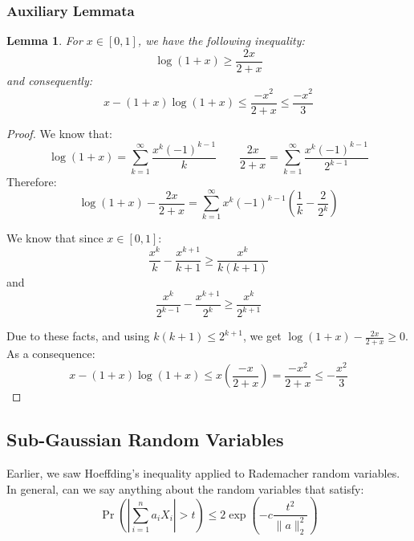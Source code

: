 \documentclass{article}
\newtheorem{lemma}{Lemma}[subsection]
\theoremstyle{remark}
\begin{document}
\subsubsection{Auxiliary Lemmata}
\begin{lemma}
\label{lem:log1p_lower}
For \(x \in [0, 1]\), we have the following inequality:
\begin{equation*}
\log(1 + x) \geq \frac{2x}{2 + x}
\end{equation*}
and consequently:
\begin{equation*}
x - (1 + x)\log(1 + x) \leq \frac{-x^{2}}{2 + x} \leq \frac{-x^{2}}{3}
\end{equation*}
\end{lemma}

\begin{proof}
We know that:
\begin{equation*}
\log(1 + x) = \sum_{k=1}^{\infty} \frac{x^{k}(-1)^{k-1}}{k} \qquad \frac{2x}{2 + x} = \sum_{k=1}^{\infty} \frac{x^{k}(-1)^{k-1}}{2^{k-1}}
\end{equation*}
Therefore:
\begin{equation*}
\log(1 + x) - \frac{2x}{2 + x} = \sum_{k=1}^{\infty} x^{k}(-1)^{k-1}\left(\frac{1}{k} - \frac{2}{2^{k}}\right)
\end{equation*}

We know that since \(x \in [0, 1]\):
\begin{equation*}
\frac{x^{k}}{k} - \frac{x^{k+1}}{k+1} \geq \frac{x^{k}}{k(k+1)}
\end{equation*}
and
\begin{equation*}
\frac{x^{k}}{2^{k-1}} - \frac{x^{k+1}}{2^{k}} \geq \frac{x^{k}}{2^{k+1}}
\end{equation*}

Due to these facts, and using \(k(k + 1) \leq 2^{k+1}\), we get \(\log(1 + x) - \frac{2x}{2 + x} \geq 0\). As a consequence:
\begin{equation*}
x - (1 + x)\log(1 + x) \leq x\left(\frac{-x}{2 + x}\right) = \frac{-x^{2}}{2 + x} \leq -\frac{x^{2}}{3}
\end{equation*}
\end{proof}

\subsection{Sub-Gaussian Random Variables}
Earlier, we saw Hoeffding's inequality applied to Rademacher random variables. In general, can we say anything about the random variables that satisfy:
\begin{equation*}
\Pr\left(\left|\sum_{i=1}^{n}a_{i}X_{i}\right| > t\right) \leq 2\exp\left(-c\frac{t^{2}}{\|a\|_{2}^{2}}\right)
\end{equation*}
\end{document}
